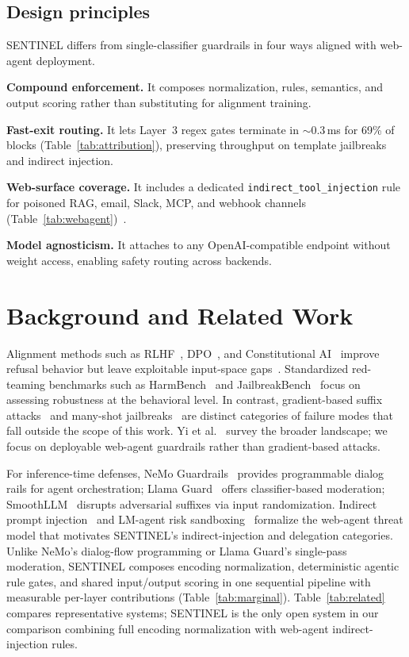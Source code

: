 \documentclass[conference]{IEEEtran}
\begin{document}
\subsection{Design principles}

SENTINEL differs from single-classifier guardrails in four ways aligned with web-agent deployment.

\textbf{Compound enforcement.} It composes normalization, rules, semantics, and
output scoring rather than substituting for alignment training.

\textbf{Fast-exit routing.} It lets Layer~3 regex gates terminate in
${\sim}$0.3\,ms for 69\% of blocks (Table~\ref{tab:attribution}), preserving
throughput on template jailbreaks and indirect injection.

\textbf{Web-surface coverage.} It includes a dedicated
\texttt{indirect\_tool\_injection} rule for poisoned RAG, email, Slack, MCP,
and webhook channels (Table~\ref{tab:webagent})~\cite{greshake2023not}.

\textbf{Model agnosticism.} It attaches to any OpenAI-compatible endpoint
without weight access, enabling safety routing across backends.

\section{Background and Related Work}
\label{sec:background}

Alignment methods such as RLHF~\cite{ouyang2022training,christiano2017deep},
DPO~\cite{rafailov2023direct}, and Constitutional
AI~\cite{bai2022constitutional} improve refusal behavior but leave exploitable
input-space gaps~\cite{wei2023jailbroken,yang2023shadow}.
Standardized red-teaming benchmarks such as HarmBench~\cite{mazeika2024harmbench} and JailbreakBench~\cite{chao2024jailbreakbench} focus on assessing robustness at the behavioral level. In contrast, gradient-based suffix attacks~\cite{zou2023universal} and many-shot jailbreaks~\cite{anil2024many} are distinct categories of failure modes that fall outside the scope of this work.
Yi et al.~\cite{yi2024jailbreak} survey the broader landscape; we focus on
deployable web-agent guardrails rather than gradient-based attacks.

For inference-time defenses, NeMo Guardrails~\cite{rebedea2023nemo} provides
programmable dialog rails for agent orchestration; Llama
Guard~\cite{inan2023llama} offers classifier-based moderation; SmoothLLM~\cite{robey2023smoothllm}
disrupts adversarial suffixes via input randomization.
Indirect prompt injection~\cite{greshake2023not} and LM-agent risk
sandboxing~\cite{ruan2024identifying} formalize the web-agent threat model that
motivates SENTINEL's indirect-injection and delegation categories.
Unlike NeMo's dialog-flow programming or Llama Guard's single-pass moderation,
SENTINEL composes encoding normalization, deterministic agentic rule gates, and
shared input/output scoring in one sequential pipeline with measurable per-layer
contributions (Table~\ref{tab:marginal}).
Table~\ref{tab:related} compares representative systems; SENTINEL is the only
open system in our comparison combining full encoding normalization with
web-agent indirect-injection rules.
\end{document}
